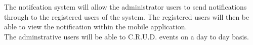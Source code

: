 {
The notifcation system will allow the administrator users to send notifications through to the registered users of the system.
The registered users will then be able to view the notification within the mobile application.\\
The adminstrative users will be able to C.R.U.D. events on a day to day basis.
}
